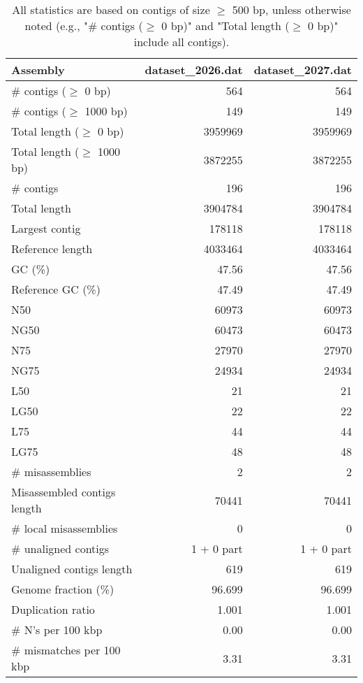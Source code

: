 \documentclass[12pt,a4paper]{article}
\begin{document}
\begin{table}[ht]
\begin{center}
\caption{All statistics are based on contigs of size $\geq$ 500 bp, unless otherwise noted (e.g., "\# contigs ($\geq$ 0 bp)" and "Total length ($\geq$ 0 bp)" include all contigs).}
\begin{tabular}{|l*{2}{|r}|}
\hline
Assembly & dataset\_2026.dat & dataset\_2027.dat \\ \hline
\# contigs ($\geq$ 0 bp) & 564 & 564 \\ \hline
\# contigs ($\geq$ 1000 bp) & 149 & 149 \\ \hline
Total length ($\geq$ 0 bp) & 3959969 & 3959969 \\ \hline
Total length ($\geq$ 1000 bp) & 3872255 & 3872255 \\ \hline
\# contigs & 196 & 196 \\ \hline
Total length & 3904784 & 3904784 \\ \hline
Largest contig & 178118 & 178118 \\ \hline
Reference length & 4033464 & 4033464 \\ \hline
GC (\%) & 47.56 & 47.56 \\ \hline
Reference GC (\%) & 47.49 & 47.49 \\ \hline
N50 & 60973 & 60973 \\ \hline
NG50 & 60473 & 60473 \\ \hline
N75 & 27970 & 27970 \\ \hline
NG75 & 24934 & 24934 \\ \hline
L50 & 21 & 21 \\ \hline
LG50 & 22 & 22 \\ \hline
L75 & 44 & 44 \\ \hline
LG75 & 48 & 48 \\ \hline
\# misassemblies & 2 & 2 \\ \hline
Misassembled contigs length & 70441 & 70441 \\ \hline
\# local misassemblies & 0 & 0 \\ \hline
\# unaligned contigs & 1 + 0 part & 1 + 0 part \\ \hline
Unaligned contigs length & 619 & 619 \\ \hline
Genome fraction (\%) & 96.699 & 96.699 \\ \hline
Duplication ratio & 1.001 & 1.001 \\ \hline
\# N's per 100 kbp & 0.00 & 0.00 \\ \hline
\# mismatches per 100 kbp & 3.31 & 3.31 \\ \hline

\end{tabular}
\end{center}
\end{table}
\end{document}
